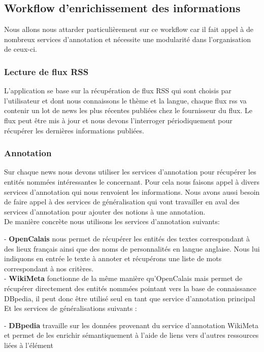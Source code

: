 \documentclass[]{easychair}
\begin{document}
\subsection{Workflow d'enrichissement des informations}
Nous allons nous attarder particulièrement sur ce workflow car il fait appel à de nombreux services d'annotation et nécessite une modularité dans l'organisation de ceux-ci.

\subsubsection{Lecture de flux RSS}
L'application se base sur la récupération de flux RSS qui sont choisis par l'utilisateur et dont nous connaissons le thème et la langue, chaque flux rss va contenir un lot de news les plus récentes publiées chez le fournisseur du flux. Le flux peut être mis à jour et nous devons l'interroger périodiquement pour récupérer les dernières informations publiées.

\subsubsection{Annotation }
Sur chaque news nous devons utiliser les services d'annotation pour récupérer les entités nommées intéressantes le concernant. Pour cela nous faisons appel à divers services d'annotation qui nous renvoient les informations. Nous avons aussi besoin de faire appel à des services de généralisation qui vont travailler en aval des services d'annotation pour ajouter des notions à une annotation.\\
De manière concrète nous utilisons les services d'annotation suivants:

- \textbf{OpenCalais} nous permet de récupérer les entités des textes correspondant à des lieux français ainsi que des noms de personnalités en langue anglaise. Nous lui indiquons en entrée le texte à annoter et récupérons une liste de mots correspondant à nos critères.\\

- \textbf{WikiMeta} fonctionne de la même manière qu'OpenCalais mais permet de récupérer directement des entités nommées pointant vers la base de connaissance DBpedia, il peut donc être utilisé seul en tant que service d'annotation principal \\

Et les services de généralisations suivants :

- \textbf{DBpedia} travaille sur les données provenant du service d'annotation WikiMeta et permet de les enrichir sémantiquement à l'aide de liens vers d'autres ressources liées à l'élément \\
\end{document}
